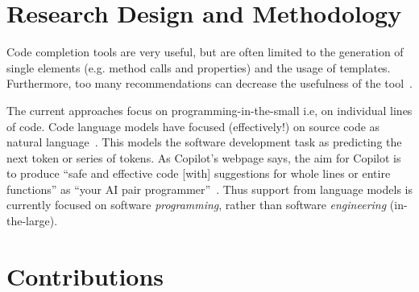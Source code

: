 \section{Research Design and Methodology}
Code completion tools are very useful, but are often limited to the generation of single elements (e.g. method calls and properties) and the usage of templates. Furthermore, too many recommendations can decrease the usefulness of the tool~\cite{Proksch2015}. 

The current \cct{} approaches focus on programming-in-the-small \cite{DeRemer1976} i.e, on individual lines of code. 
Code language models have focused (effectively!) on source code as natural language~\cite{natural}.
This models the software development task as predicting the next token or series of tokens.
As Copilot's webpage says, the aim for Copilot is to produce ``safe and effective code [with] suggestions for whole lines or entire functions'' as ``your AI pair programmer''~\cite{Copilot-web}. 
Thus support from language models is currently focused on software \textit{programming}, rather than software \emph{engineering} (in-the-large).

\section{Contributions}
